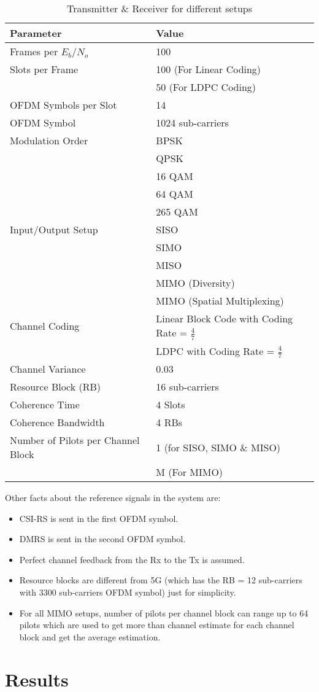 \begin{table}[ht]
    \centering
    \caption{Transmitter \& Receiver for different setups}
    \label{tbl:ch parameters}
    \begin{tabular}{ll}
        \toprule
        Parameter & Value \\
        \midrule
        Frames per $E_b$/$N_o$ & 100 \\
        Slots per Frame & 100 (For Linear Coding) \\
                        & 50 (For LDPC Coding) \\
        OFDM Symbols per Slot & 14 \\
        OFDM Symbol & 1024 sub-carriers \\
        Modulation Order & BPSK \\
                         & QPSK \\
                         & 16 QAM \\
                         & 64 QAM \\
                         & 265 QAM \\
        Input/Output Setup & SISO \\
                           & SIMO \\
                           & MISO \\
                           & MIMO (Diversity) \\
                           & MIMO (Spatial Multiplexing) \\
        Channel Coding & Linear Block Code with Coding Rate = $\frac{4}{7}$ \\
                       & LDPC with Coding Rate = $\frac{4}{7}$ \\
        Channel Variance & 0.03 \\
        Resource Block (RB) & 16 sub-carriers \\
        Coherence Time & 4 Slots \\
        Coherence Bandwidth & 4 RBs \\ 
        Number of Pilots per Channel Block & 1 (for SISO, SIMO \& MISO) \\
        & M (For MIMO) \\
        \bottomrule
    \end{tabular}
\end{table}
Other facts about the reference signals in the system are:
\begin{itemize}
    \item CSI-RS is sent in the first OFDM symbol.
    \item DMRS is sent in the second OFDM symbol.
    \item Perfect channel feedback from the Rx to the Tx is assumed.
    \item Resource blocks are different from 5G (which has the RB = 12 sub-carriers with 3300 sub-carriers OFDM symbol) just for simplicity.
    \item For all MIMO setups, number of pilots per channel block can range up to 64 pilots which are used to get more than channel estimate for each channel block and get the average estimation.
\end{itemize}

\section{Results}